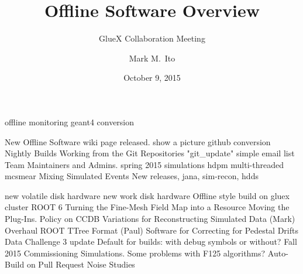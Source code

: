 \documentclass[xcolor=dvipsnames,hyperref={pdfpagelabels=false}]{beamer}
\title{Offline Software Overview}
\subtitle{GlueX Collaboration Meeting}
\author[Mark Ito]{Mark M.\ Ito}
\date{October 9, 2015}
\institute[JLab]{Jefferson Lab}
\newcommand{\f}{\frame}
\begin{document}
\f{\titlepage}

offline monitoring
geant4 conversion

New Offline Software wiki page released.
  show a picture
github conversion
  Nightly Builds Working from the Git Repositories
  "git_update" simple email list
  Team Maintainers and Admins.
spring 2015 simulations
hdpm
multi-threaded mcsmear
Mixing Simulated Events
New releases, jana, sim-recon, hdds

new volatile disk hardware
new work disk hardware
Offline style build on gluex cluster
ROOT 6
Turning the Fine-Mesh Field Map into a Resource
Moving the Plug-Ins.
Policy on CCDB Variations for Reconstructing Simulated Data (Mark)
Overhaul ROOT TTree Format (Paul)
Software for Correcting for Pedestal Drifts
Data Challenge 3 update
Default for builds: with debug symbols or without?
Fall 2015 Commissioning Simulations. 
Some problems with F125 algorithms?
Auto-Build on Pull Request
Noise Studies
\end{document}
